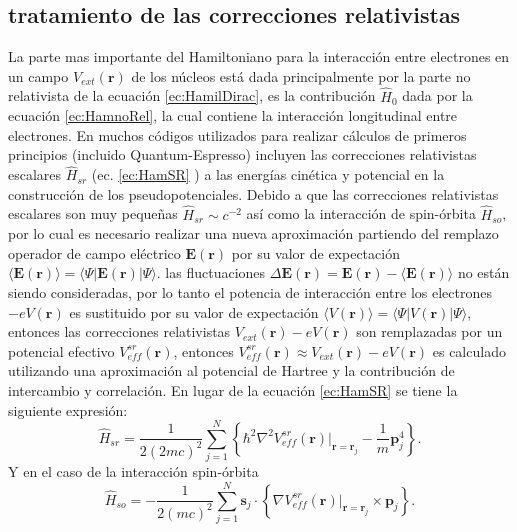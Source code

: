\documentclass[12pt,a4paper, oneside]{book}
\begin{document}
    \subsection{tratamiento de las correcciones relativistas } \label{subsec:tratamientoRel}
    La parte mas importante del Hamiltoniano para la interacci\'on entre electrones en un campo $V_{ext} (\pmb{r})$ de los n\'ucleos est\'a dada principalmente por la parte no relativista de la ecuaci\'on \ref{ec:HamilDirac}, es la contribuci\'on  $\hat{H}_0$ dada por la ecuaci\'on \ref{ec:HamnoRel}, la cual contiene la interacci\'on  longitudinal entre electrones. En muchos c\'odigos utilizados para realizar c\'alculos de primeros principios (incluido Quantum-Espresso) incluyen las correcciones relativistas escalares $\hat{H}_{sr}$ (ec. \ref{ec:HamSR} ) a las energ\'ias cin\'etica y potencial en la construcci\'on de los pseudopotenciales. Debido a que las correcciones relativistas escalares son muy peque\~nas $\hat{H}_{sr}\sim c^{-2}$ as\'i como la interacci\'on de spin-\'orbita $\hat{H}_{so}$, por lo cual es necesario realizar una nueva aproximaci\'on partiendo del remplazo operador de campo el\'ectrico $\pmb{E} (\pmb{r}) $ por su valor de expectaci\'on $ \langle \pmb{E} (\pmb{r}) \rangle = \langle \Psi | \pmb{E} (\pmb{r}) | \Psi \rangle $. las fluctuaciones $\Delta \pmb{E} (\pmb{r}) = \pmb{E} (\pmb{r}) - \langle \pmb{E} (\pmb{r}) \rangle $ no est\'an siendo consideradas, por lo tanto el potencia de interacci\'on entre los electrones $-e V (\pmb{r})$ es sustituido por su valor de expectaci\'on $ \langle V (\pmb{r}) \rangle = \langle \Psi | V (\pmb{r}) | \Psi \rangle $, entonces las correcciones relativistas $V_{ext} (\pmb{r}) - e V(\pmb{r})$ son remplazadas por un potencial efectivo  $V_{eff}^{sr} (\pmb{r})$, entonces $V_{eff}^{sr} (\pmb{r}) \approx V_{ext} (\pmb{r}) -e V (\pmb{r}) $ es calculado utilizando una aproximaci\'on al potencial de Hartree y la contribuci\'on de intercambio y correlaci\'on. En lugar de la ecuaci\'on  \ref{ec:HamSR} se tiene la siguiente expresi\'on:
    \begin{equation}
    \hat{H}_{sr} = \frac{1}{2 (2mc)^2} \sum_{j=1}^N \left\{\hbar^2 \nabla^2  V_{eff}^{sr} (\pmb{r}) |_{\pmb{r}= \pmb{r}_j} - \frac{1}{m} \pmb{p}_j^4\right\}. \label{ec:HamSR_Mean}
    \end{equation}
    Y en el caso de la interacci\'on spin-\'orbita
    \begin{equation}
    \hat{H}_{so} =- \frac{1}{2 (mc)^2} \sum_{j=1}^N \pmb{s}_j \cdot \left\{ \nabla  V_{eff}^{sr} (\pmb{r}) |_{\pmb{r}= \pmb{r}_j} \times \pmb{p}_j\right\}. \label{ec:HamSO_mean}
    \end{equation}
\end{document}
